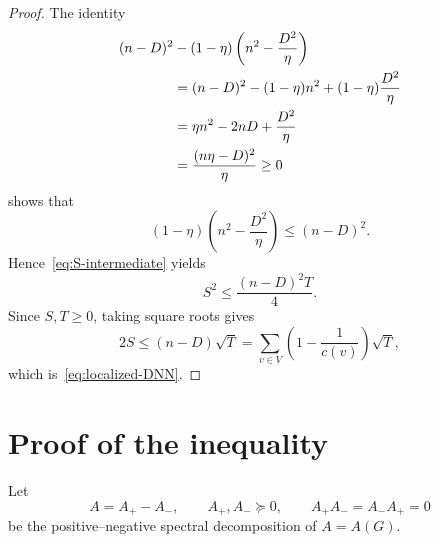 \documentclass[11pt]{article}
\numberwithin{equation}{section}
\theoremstyle{definition}
\theoremstyle{remark}
\newcommand{\Aplus}{A_{+}}
\newcommand{\Aminus}{A_{-}}
\begin{document}
\begin{proof}
		The identity
		\begin{align}
			(n-D)^2
			&-
			(1-\eta)
			\left(n^2-\frac{D^2}{\eta}\right) \notag\\
			&=(n-D)^2-(1-\eta)n^2+(1-\eta)\frac{D^2}{\eta} \notag\\
			&=\eta n^2-2nD+\frac{D^2}{\eta} \notag\\
			&=\frac{(n\eta-D)^2}{\eta}
			\geq0
			\label{eq:perfect-square}
		\end{align}
		shows that
		\[
		(1-\eta)
		\left(n^2-\frac{D^2}{\eta}\right)
		\leq(n-D)^2.
		\]
		Hence~\eqref{eq:S-intermediate} yields
		\[
		S^2\leq\frac{(n-D)^2T}{4}.
		\]
		Since $S,T\geq0$, taking square roots gives
		\[
		2S\leq(n-D)\sqrt{T}=\sum_{v\in V}\left(1-\frac1{c(v)}\right)\sqrt{T},
		\]
		which is~\eqref{eq:localized-DNN}.
	\end{proof}
	
	
	
	\section{Proof of the inequality}\label{sec:spectral}
	
	Let
	\begin{equation}\label{eq:spectral-decomp}
		A=\Aplus-\Aminus,
		\qquad
		\Aplus,\Aminus\succeq0,
		\qquad
		\Aplus\Aminus=\Aminus\Aplus=0
	\end{equation}
	be the positive--negative spectral decomposition of $A=A(G)$.
	
\end{document}

